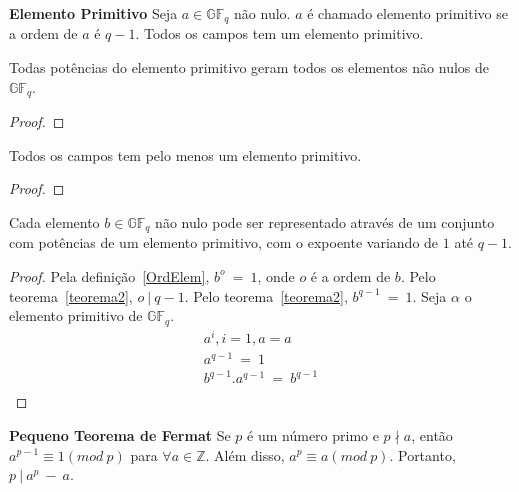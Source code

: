 \begin{definition} {\bf Elemento Primitivo} \label{ElemPrim}  Seja $a \in \mathbb{GF}_q$ não nulo. $a$ é chamado elemento primitivo se a ordem de $a$ é $q-1$. Todos os campos tem um elemento primitivo.
\end{definition}

\begin{proposition} Todas potências do elemento primitivo geram todos os elementos não nulos de $\mathbb{GF}_q$. 
\end{proposition}

\begin{proof}
\end{proof}

\begin{proposition} Todos os campos tem pelo menos um elemento primitivo.
\end{proposition}

\begin{proof}
\end{proof}

\begin{proposition}  Cada elemento $b \in \mathbb{GF}_q$ não nulo pode ser representado através de um conjunto com potências de um elemento primitivo, com o expoente variando de $1$ até $q-1$.
\end{proposition}

\begin{proof}
Pela definição~\ref{OrdElem}, $b^o\ =\ 1$, onde $o$ é a ordem de $b$. Pelo teorema~\ref{teorema2}, $o\ |\ q-1$. Pelo teorema~\ref{teorema2}, $b^{q-1}\ =\ 1$. Seja $\alpha$ o elemento primitivo de $\mathbb{GF}_q$. 
$$
\begin{array}{cl}
a^i, i = 1, a = a\\
a^{q-1}\ =\ 1\\
b^{q-1}.a^{q-1}\ =\ b^{q-1}\\
\end{array}
$$
\end{proof}


\begin{theorem} {\bf Pequeno Teorema de Fermat} \label{Fermat} 
Se $p$ é um número primo e $p \nmid a$, então $a^{p-1} \equiv 1(mod\ p)$ para $\forall a \in \mathbb{Z}$. Além disso, $a^p \equiv a(mod\ p)$.
Portanto, $p\ |\ a^p\ -\ a$. \cite{Rosen:2003}
\end{theorem}

